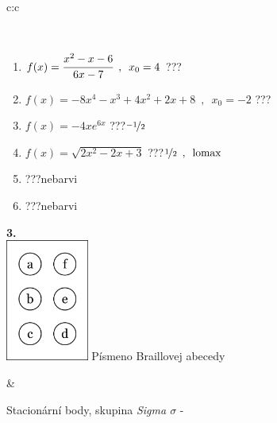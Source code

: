 \documentclass[10pt]{report}
\begin{document}
\begin{tabular}{c:c}
\begin{minipage}[c][104.5mm][t]{0.5\linewidth}
\begin{center}
\begin{minipage}{0.95\linewidth}
\begin{center}
\end{center}
\end{minipage}
\\[1mm]
\begin{minipage}{0.79\linewidth}
\begin{center}
\begin{varwidth}{\linewidth}
\begin{enumerate}
\normalsize
\item $f(x)=\cfrac{x^2-x-6}{6x-7}\enspace , \enspace x_0=4$\quad \dotfill\; ???\;\dotfill \quad {}
\item $f(x)=-8x^4-x^3+4x^2+2x+8\enspace , \enspace x_0=-2$\quad \dotfill\; ???\;\dotfill \quad {}
\item $f(x)=-4xe^{6x}$\quad \dotfill\; ???\;\dotfill \quad $\nicefrac{-1}{2}$
\item $f(x)=\sqrt{2x^2-2x+3}$\quad \dotfill\; ???\;\dotfill \quad $\nicefrac{1}{2}\enspace , \enspace\mathrm{lomax}$
\item \quad \dotfill\; ???\;\dotfill \quad nebarvi
\item \quad \dotfill\; ???\;\dotfill \quad nebarvi
\end{enumerate}
\end{varwidth}
\end{center}
\end{minipage}
\begin{minipage}{0.20\linewidth}
\begin{center}
{\Huge\bfseries 3.} \\[2mm]
\includegraphics[height=40mm]{../images/braille.png}
{\small Písmeno Braillovej abecedy}
\end{center}
\end{minipage}
\end{center}
\end{minipage}
&
\begin{minipage}[c][104.5mm][t]{0.5\linewidth}
\begin{center}
\vspace{7mm}
{\huge Stacionární body, skupina \textit{Sigma $\sigma$} -}\\[5mm]

\end{center}
\end{minipage}
\end{tabular}
\end{document}
